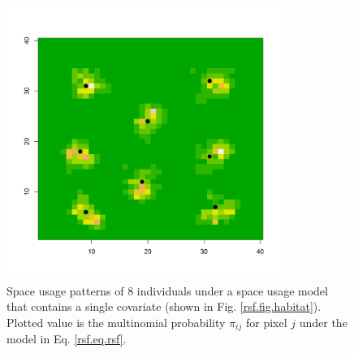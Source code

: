 \documentclass[12pt]{article}
\begin{document}
\begin{figure}
\centering
\includegraphics[width=3.5in,height=3.5in]{figs/homeranges8}
\caption{Space usage patterns of 8 individuals under a space usage
  model that contains a single covariate (shown in
  Fig. \ref{rsf.fig.habitat}). Plotted value is the multinomial
  probability $\pi_{ij}$ for pixel $j$ under the model in Eq. \ref{rsf.eq.rsf}.
}
\label{rsf.fig.homeranges}
\end{figure}

\clearpage
\newpage
\end{document}
